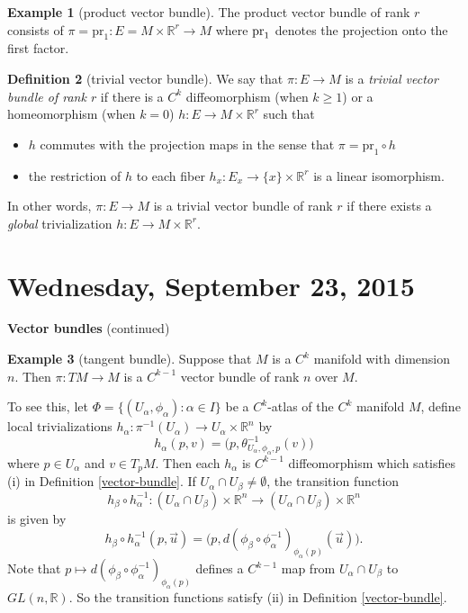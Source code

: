 \documentclass{amsart}
\numberwithin{equation}{section}
\newcommand{\bR}{\mathbb{R}}
\theoremstyle{definition}
\newtheorem{definition}{Definition} [section]
\newtheorem{example}[definition]{Example}
\theoremstyle{theorem}
\begin{document}
\begin{example}[product vector bundle]
The product vector bundle of rank $r$ consists of $\pi= \mathrm{pr}_1 : E= M \times \bR^r \to M$ where $\rm{pr}_1$ 
denotes the projection onto the first factor. 
\end{example}

\begin{definition}[trivial vector bundle]\label{trivial}
We say that $\pi : E \to M$ is a {\em trivial vector bundle of rank $r$} if there is a $C^k$ diffeomorphism (when $k\geq 1$)
or a homeomorphism (when $k=0$) $h : E \to M \times \bR^r$ such that 
\begin{itemize}
\item $h$ commutes with the projection maps in the sense that $\pi = \mathrm{pr}_1 \circ h$
\item the restriction of $h$ to each fiber $h_x : E_x \to \{x\} \times \bR^r$ is a linear isomorphism. 
\end{itemize}
In other words, $\pi:E\to M$ is a trivial vector bundle of rank $r$ if there exists
a {\em global} trivialization $h:E\to M\times\bR^r$.
\end{definition}



\section{Wednesday, September 23, 2015}

\noindent
{\large {\bf Vector bundles} (continued)}

\begin{example}[tangent bundle]
Suppose that $M$ is a $C^k$ manifold with dimension $n$. Then $\pi : TM \to M$ is a $C^{k-1}$ vector bundle of rank $n$ over $M$. 

To see this, let $\Phi=\{(U_\alpha,\phi_\alpha):\alpha\in I\}$ be a $C^k$-atlas of the $C^k$ manifold $M$, define
local trivializations $h_\alpha: \pi^{-1}(U_\alpha)\to U_\alpha\times \bR^n$ by 
$$
h_\alpha(p,v)= \big( p, \theta_{U_\alpha,\phi_\alpha,p}^{-1}(v) \big)
$$
where $p\in U_\alpha$ and $v\in T_pM$. Then each $h_\alpha$ is $C^{k-1}$ diffeomorphism which satisfies (i) in Definition \ref{vector-bundle}.
If $U_\alpha\cap U_\beta\neq \emptyset$, the transition function 
$$
h_\beta\circ h_\alpha^{-1}: (U_\alpha\cap U_{\beta})\times \bR^n   \to (U_\alpha\cap U_\beta)\times \bR^n
$$
is given by 
$$
h_\beta\circ h_\alpha^{-1}(p,\vec{u})= \big(p,d(\phi_\beta\circ\phi^{-1}_\alpha)_{\phi_\alpha(p)}(\vec{u})\big).
$$
Note that $p\mapsto d(\phi_\beta\circ \phi_\alpha^{-1})_{\phi_\alpha(p)}$ defines a $C^{k-1}$ map from $U_\alpha\cap U_\beta$ to $GL(n,\bR)$.
So the transition functions satisfy (ii) in Definition \ref{vector-bundle}.
\end{example}
\end{document}
